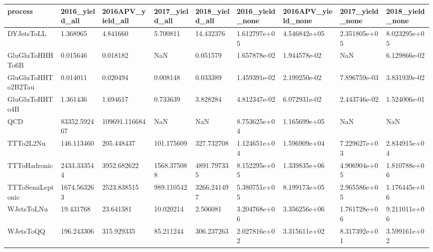 \begin{tabular}{lllllllll}
\toprule
           process & 2016\_yield\_all & 2016APV\_yield\_all & 2017\_yield\_all & 2018\_yield\_all & 2016\_yield\_none & 2016APV\_yield\_none & 2017\_yield\_none & 2018\_yield\_none \\
\midrule
        DYJetsToLL &       1.368965 &          4.841660 &       5.700811 &      14.432376 &    1.612797e+05 &       4.546842e+05 &    2.351805e+05 &    8.023295e+05 \\
   GluGluToHHHTo6B &       0.015646 &          0.018182 &            NaN &       0.051579 &    1.657878e-02 &       1.944578e-02 &             NaN &    6.129866e-02 \\
GluGluToHHTo2B2Tau &       0.014011 &          0.020494 &       0.008148 &       0.033389 &    1.459391e-02 &       2.199250e-02 &    7.896759e-03 &    3.831939e-02 \\
    GluGluToHHTo4B &       1.361436 &          1.694617 &       0.733639 &       3.828284 &    4.812347e-02 &       6.072931e-02 &    2.443746e-02 &    1.524006e-01 \\
               QCD &   83352.592467 &     109691.116684 &            NaN &            NaN &    8.753625e+04 &       1.165699e+05 &             NaN &             NaN \\
         TTTo2L2Nu &     146.113460 &        205.448437 &     101.175609 &     327.732708 &    1.124651e+04 &       1.596909e+04 &    7.229627e+03 &    2.834915e+04 \\
      TTToHadronic &    2433.333544 &       3952.682622 &    1568.375088 &    4891.797335 &    8.152295e+05 &       1.339835e+06 &    4.906904e+05 &    1.810788e+06 \\
  TTToSemiLeptonic &    1674.563263 &       2523.838515 &     989.110542 &    3266.241497 &    5.380751e+05 &       8.199173e+05 &    2.965586e+05 &    1.176445e+06 \\
        WJetsToLNu &      19.431768 &         23.641381 &      10.020214 &       2.506081 &    3.204768e+06 &       3.356256e+06 &    1.761728e+06 &    9.211011e+06 \\
         WJetsToQQ &     196.243306 &        315.929335 &      85.211244 &     306.237263 &    2.027816e+02 &       3.315611e+02 &    8.317392e+01 &    3.599161e+02 \\
\bottomrule
\end{tabular}
